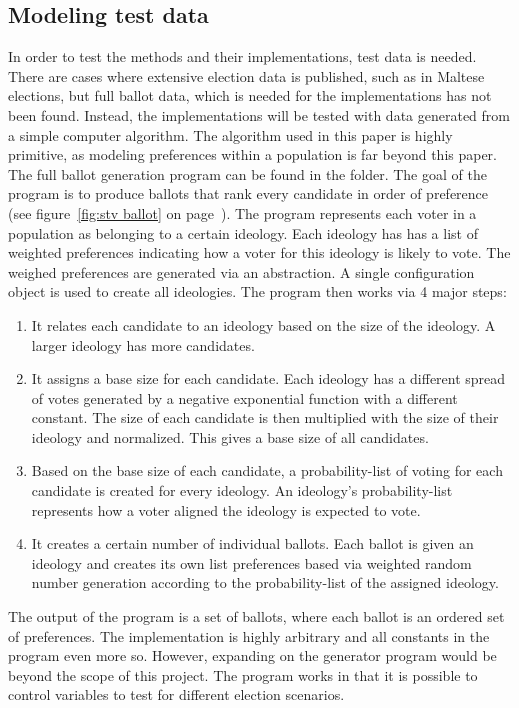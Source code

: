 \documentclass[12pt]{article}
\begin{document}
\subsection{Modeling test data}
In order to test the methods and their implementations, test data is needed. There are cases where extensive election data is published, such as in Maltese elections, but full ballot data, which is needed for the implementations has not been found. Instead, the implementations will be tested with data generated from a simple computer algorithm. The algorithm used in this paper is highly primitive, as modeling preferences within a population is far beyond this paper. The full ballot generation program can be found in the  folder. The goal of the program is to produce ballots that rank every candidate in order of preference (see figure~\ref{fig:stv ballot} on page~\pageref{fig:stv ballot}). The program represents each voter in a population as belonging to a certain ideology. Each ideology has has a list of weighted preferences indicating how a voter for this ideology is likely to vote. The weighed preferences are generated via an abstraction. A single configuration object is used to create all ideologies.
The program then works via 4 major steps:
\begin{enumerate}
	\item It relates each candidate to an ideology based on the size of the ideology. A larger ideology has more candidates.
	\item It assigns a base size for each candidate. Each ideology has a different spread of votes generated by a negative exponential function with a different constant. The size of each candidate is then multiplied with the size of their ideology and normalized. This gives a base size of all candidates.
	\item Based on the base size of each candidate, a probability-list of voting for each candidate is created for every ideology. An ideology's probability-list represents how a voter aligned the ideology is expected to vote.
	\item It creates a certain number of individual ballots. Each ballot is given an ideology and creates its own list preferences based via weighted random number generation according to the probability-list of the assigned ideology.
\end{enumerate}
The output of the program is a set of ballots, where each ballot is an ordered set of preferences. The implementation is highly arbitrary and all constants in the program even more so. However, expanding on the generator program would be beyond the scope of this project. The program works in that it is possible to control variables to test for different election scenarios.
\end{document}

